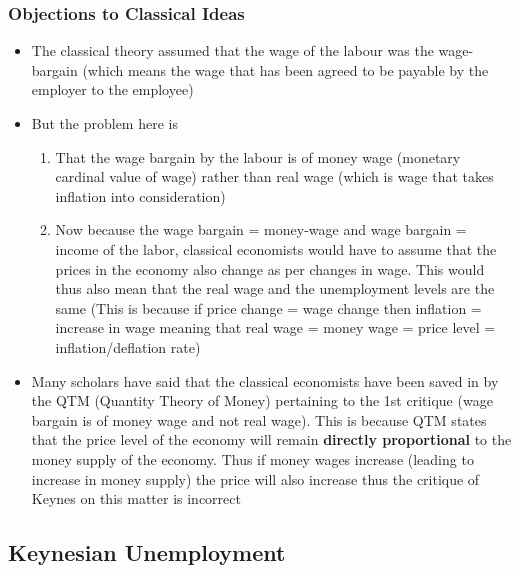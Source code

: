 \documentclass[11pt]{article}
\begin{document}
\subsubsection{Objections to Classical Ideas}
\label{sec:org816905e}
\begin{itemize}
\item The classical theory assumed that the wage of the labour was the wage-bargain (which means the wage that has been agreed to be payable by the employer to the employee)

\item But the problem here is
\begin{enumerate}
\item That the wage bargain by the labour is of money wage (monetary cardinal value of wage) rather than real wage (which is wage that takes inflation into consideration)
\item Now because the wage bargain = money-wage and wage bargain = income of the labor, classical economists would have to assume that the prices in the economy also change as per changes in wage. This would thus also mean that the real wage and the unemployment levels are the same (This is because if price change = wage change then inflation = increase in wage meaning that real wage = money wage = price level = inflation/deflation rate)
\end{enumerate}

\item Many scholars have said that the classical economists have been saved in by the QTM (Quantity Theory of Money) pertaining to the 1st critique (wage bargain is of money wage and not real wage). This is because QTM states that the price level of the economy will remain \textbf{directly proportional} to the money supply of the economy. Thus if money wages increase (leading to increase in money supply) the price will also increase thus the critique of Keynes on this matter is incorrect
\end{itemize}

\subsection{Keynesian Unemployment}
\label{sec:org81476d3}
\end{document}
